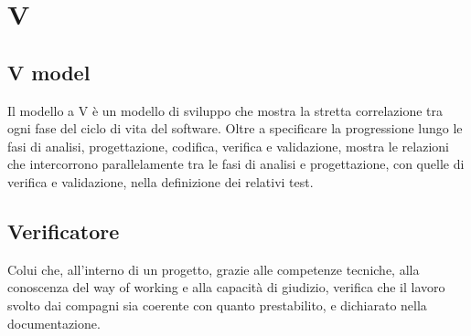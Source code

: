\chapter{V}

\section{V model}
Il modello a V è un modello di sviluppo che mostra la stretta correlazione tra ogni fase del ciclo di vita del software. Oltre a specificare la progressione lungo le fasi di analisi, progettazione, codifica, verifica e validazione, mostra le relazioni che intercorrono parallelamente tra le fasi di analisi e progettazione, con quelle di verifica e validazione, nella definizione dei relativi test.

\section{Verificatore}\label{sec:Verificatori}
Colui che, all'interno di un progetto, grazie alle competenze tecniche, alla conoscenza del way of working e alla capacità di giudizio, verifica che il lavoro svolto dai compagni sia coerente con quanto prestabilito, e dichiarato nella documentazione.
